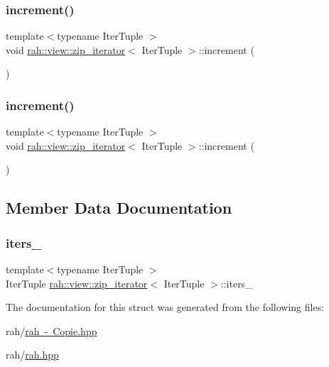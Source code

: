 \subsubsection{\texorpdfstring{increment()}{increment()}\hspace{0.1cm}{\footnotesize\ttfamily [1/2]}}
{\footnotesize\ttfamily template$<$typename Iter\+Tuple $>$ \\
void \mbox{\hyperlink{structrah_1_1view_1_1zip__iterator}{rah\+::view\+::zip\+\_\+iterator}}$<$ Iter\+Tuple $>$\+::increment (\begin{DoxyParamCaption}{ }\end{DoxyParamCaption})\hspace{0.3cm}{\ttfamily [inline]}}

\mbox{\label{structrah_1_1view_1_1zip__iterator_a156b181d725c31af3c34180806d6428e}} 
\subsubsection{\texorpdfstring{increment()}{increment()}\hspace{0.1cm}{\footnotesize\ttfamily [2/2]}}
{\footnotesize\ttfamily template$<$typename Iter\+Tuple $>$ \\
void \mbox{\hyperlink{structrah_1_1view_1_1zip__iterator}{rah\+::view\+::zip\+\_\+iterator}}$<$ Iter\+Tuple $>$\+::increment (\begin{DoxyParamCaption}{ }\end{DoxyParamCaption})\hspace{0.3cm}{\ttfamily [inline]}}



\subsection{Member Data Documentation}
\mbox{\label{structrah_1_1view_1_1zip__iterator_a58f5f6dd935fe51dd3c3a28e3b06ecc9}} 
\subsubsection{\texorpdfstring{iters\_}{iters\_}}
{\footnotesize\ttfamily template$<$typename Iter\+Tuple $>$ \\
Iter\+Tuple \mbox{\hyperlink{structrah_1_1view_1_1zip__iterator}{rah\+::view\+::zip\+\_\+iterator}}$<$ Iter\+Tuple $>$\+::iters\+\_\+}



The documentation for this struct was generated from the following files\+:\begin{DoxyCompactItemize}
\item 
rah/\mbox{\hyperlink{rah_01-_01_copie_8hpp}{rah -\/ Copie.\+hpp}}\item 
rah/\mbox{\hyperlink{rah_8hpp}{rah.\+hpp}}\end{DoxyCompactItemize}
